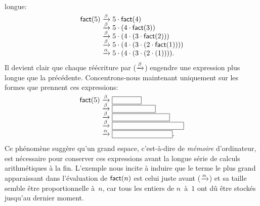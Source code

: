 longue:\label{trace_fact_5}
\begin{equation*}
\begin{array}{r@{\;}c@{\;}l}
\fun{fact}(5)
& \smashedrightarrow{\beta} & 5 \cdot \fun{fact}(4)\\
& \smashedrightarrow{\beta} & 5 \cdot (4 \cdot \fun{fact}(3))\\
& \smashedrightarrow{\beta} & 5 \cdot (4 \cdot (3 \cdot \fun{fact}(2)))\\
& \smashedrightarrow{\beta} & 5 \cdot (4 \cdot (3 \cdot (2 \cdot
                              \fun{fact}(1))))\\
& \smashedrightarrow{\alpha} & 5 \cdot (4 \cdot (3 \cdot (2 \cdot
(1)))).
\end{array}
\end{equation*}
Il devient clair que chaque réécriture par
(\(\xrightarrow{\smash[t]{\beta}}\)) engendre une expression plus
longue que la précédente. Concentrons-nous maintenant uniquement sur
les formes que prennent ces expressions:
\begin{equation*}
\setlength\fboxsep{0mm}
\begin{array}{r@{\;}c@{\;}l}
\fun{fact}(5)
& \smashedrightarrow{\beta} & \fbox{\phantom{$5 \cdot \fun{fact}(4)$}}\\
& \smashedrightarrow{\beta} & \fbox{\phantom{$5 \cdot (4 \cdot \fun{fact}(3))$}}\\
& \smashedrightarrow{\beta} & \fbox{\phantom{$5 \cdot (4 \cdot (3 \cdot \fun{fact}(2)))$}}\\
& \smashedrightarrow{\beta} & \fbox{\phantom{$5 \cdot (4 \cdot (3 \cdot (2 \cdot \fun{fact}(1))))$}}\\
& \smashedrightarrow{\alpha} & \fbox{\phantom{$5 \cdot (4 \cdot (3
    \cdot (2 \cdot (1))))$}}.
\end{array}
\end{equation*}
Ce phénomène suggère qu'un grand espace, c'est-à-dire de
\emph{mémoire} d'ordinateur, est nécessaire pour conserver ces
expressions avant la longue série de calculs arithmétiques à la
fin. L'exemple nous incite à induire que le terme le plus grand
apparaissant dans l'évaluation de \(\textsf{fact}(n)\) est celui juste
avant (\(\xrightarrow{\smash[t]{\alpha}}\)) et sa taille semble être
proportionnelle à~\(n\), car tous les entiers de \(n\)~à~\(1\) ont dû
être stockés jusqu'au dernier moment.

